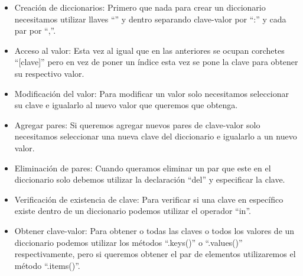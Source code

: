 \begin{itemize}
    \item Creación de diccionarios: Primero que nada para crear un diccionario necesitamos utilizar llaves ``{}'' y dentro separando clave-valor por ``:'' y cada par por ``,''.
    \item Acceso al valor: Esta vez al igual que en las anteriores se ocupan corchetes ``[clave]'' pero en vez de poner un índice esta vez se pone la clave para obtener su respectivo valor.
    \item Modificación del valor: Para modificar un valor solo necesitamos seleccionar su clave e igualarlo al nuevo valor que queremos que obtenga.
    \item Agregar pares: Si queremos agregar nuevos pares de clave-valor solo necesitamos seleccionar una nueva clave del diccionario e igualarlo a un nuevo valor.
    \item Eliminación de pares: Cuando queramos eliminar un par que este en el diccionario solo debemos utilizar la declaración ``del'' y especificar la clave.
    \item Verificación de existencia de clave: Para verificar si una clave en específico existe dentro de un diccionario podemos utilizar el operador ``in''.
    \item  Obtener clave-valor: Para obtener o todas las claves o todos los valores de un diccionario podemos utilizar los métodos ``.keys()'' o ``.values()'' respectivamente, pero si queremos obtener el par de elementos utilizaremos el método ``.items()''.
\end{itemize}
